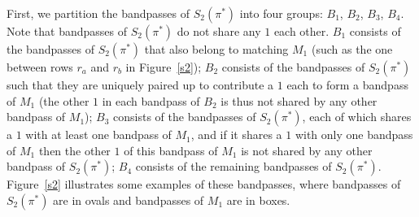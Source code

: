 \documentclass[11pt,twoside]{article}\usepackage{amssymb,latexsym,graphicx,hyperref}\usepackage{epstopdf}
\begin{document}
First, we partition the bandpasses of $S_2(\pi^*)$ into four groups: $B_1$, $B_2$, $B_3$, $B_4$.
Note that bandpasses of $S_2(\pi^*)$ do not share any $1$ each other.
$B_1$ consists of the bandpasses of $S_2(\pi^*)$ that also belong to matching $M_1$ (such as the one between rows $r_a$ and $r_b$ in Figure~\ref{s2});
$B_2$ consists of the bandpasses of $S_2(\pi^*)$ such that they are uniquely paired up to contribute a $1$ each to form a bandpass of $M_1$
(the other $1$ in each bandpass of $B_2$ is thus not shared by any other bandpass of $M_1$);
$B_3$ consists of the bandpasses of $S_2(\pi^*)$, each of which shares a $1$ with at least one bandpass of $M_1$,
and if it shares a $1$ with only one bandpass of $M_1$ then the other $1$ of this bandpass of $M_1$ is not shared by any other bandpass of $S_2(\pi^*)$;
$B_4$ consists of the remaining bandpasses of $S_2(\pi^*)$.
Figure~\ref{s2} illustrates some examples of these bandpasses, where bandpasses of $S_2(\pi^*)$ are in ovals and bandpasses of $M_1$ are in boxes.
\end{document}
